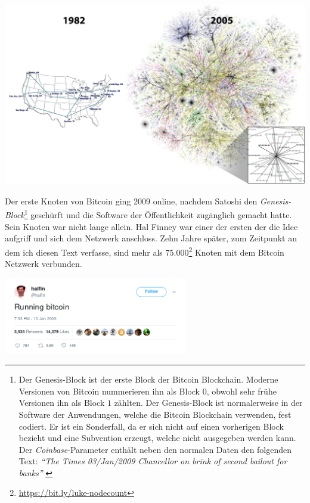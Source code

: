 \begin{center}
  \includegraphics[width=\textwidth]{assets/images/internet-evolution-white-dates.png}
  \label{fig:internet-evolution-white-dates}
\end{center}

Der erste Knoten von Bitcoin ging 2009 online, nachdem Satoshi den
\textit{Genesis-Block}\footnote{ Der Genesis-Block ist der erste Block der
Bitcoin Blockchain. Moderne Versionen von Bitcoin nummerieren ihn als Block $0$,
obwohl sehr frühe Versionen ihn als Block $1$ zählten. Der Genesis-Block ist
normalerweise in der Software der Anwendungen, welche die Bitcoin Blockchain
verwenden, fest codiert.  Er ist ein Sonderfall, da er sich nicht auf einen
vorherigen Block bezieht und eine Subvention erzeugt, welche nicht ausgegeben
werden kann. Der \textit{Coinbase}-Parameter enthält neben den normalen Daten
den folgenden Text: \textit{\enquote{The Times 03/Jan/2009 Chancellor on brink
of second bailout for banks}} \cite{btcwiki:genesis-block}} geschürft und die
Software der Öffentlichkeit zugänglich gemacht hatte. Sein Knoten war nicht
lange allein. Hal Finney war einer der ersten der die Idee aufgriff und
sich dem Netzwerk anschloss. Zehn Jahre später, zum Zeitpunkt an dem ich diesen
Text verfasse, sind mehr als
$75.000$\footnote{\url{https://bit.ly/luke-nodecount}} Knoten mit dem Bitcoin
Netzwerk verbunden.

\begin{center}
  \centering
  \includegraphics[width=8cm]{assets/images/running-bitcoin.png}
  \label{fig:running-bitcoin}
\end{center}

